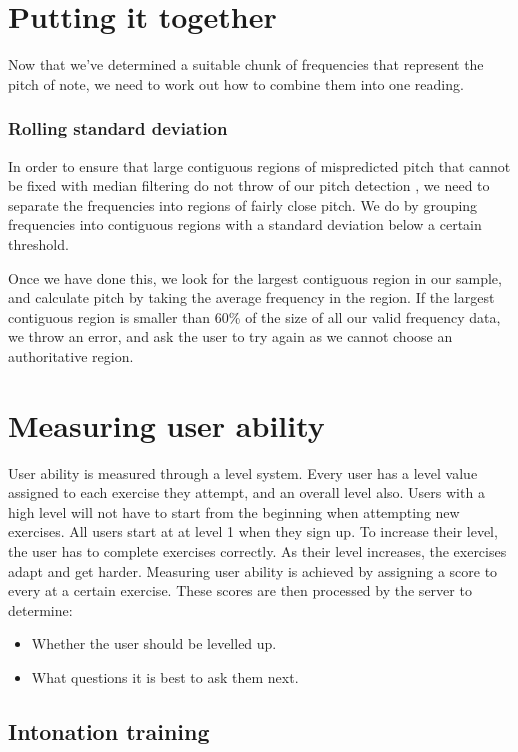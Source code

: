 \section{Putting it together}
Now that we've determined a suitable chunk of frequencies that represent the pitch of note, we need to work out how to combine them into one reading.
\subsubsection{Rolling standard deviation}
In order to ensure that large contiguous regions of mispredicted pitch that cannot be fixed with median filtering do not throw of our pitch detection , we need to separate the frequencies into regions of fairly close pitch. We do by grouping frequencies into contiguous regions with a standard deviation below a certain threshold. 

Once we have done this, we look for the largest contiguous region in our sample, and calculate pitch by taking the average frequency in the region. If the largest contiguous region is smaller than 60\% of the size of all our valid frequency data, we throw an error, and ask the user to try again as we cannot choose an authoritative region.

\section{Measuring user ability}

User ability is measured through a level system. Every user has a level value assigned to each exercise they attempt, and an overall level also. Users with a high level will not have to start from the beginning when attempting new exercises. 
All users start at at level 1 when they sign up.
To increase their level, the user has to complete exercises correctly. As their level increases, the exercises adapt and get harder.
Measuring user ability is achieved by assigning a score to every  at a certain exercise. These scores are then processed by the server to determine:
	\begin{itemize}
		\item Whether the user should be levelled up.
		\item What questions it is best to ask them next.
	\end{itemize}

\subsection{Intonation training}

